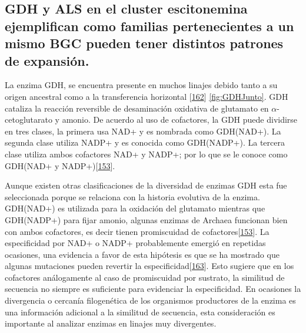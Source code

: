 \documentclass[12pt,twoside]{reedthesis}
\begin{document}
  \subsection{GDH y ALS en el cluster escitonemina ejemplifican como
  familias pertenecientes a un mismo BGC pueden tener distintos patrones
  de
  expansión.}\label{gdh-y-als-en-el-cluster-escitonemina-ejemplifican-como-familias-pertenecientes-a-un-mismo-bgc-pueden-tener-distintos-patrones-de-expansion.}
  
  La enzima GDH, se encuentra presente en muchos linajes debido tanto a su
  origen ancestral como a la transferencia horizontal
  {[}\protect\hyperlink{ref-andersson_evolution_2003}{162}{]}
  \autoref{fig:GDHJunto}. GDH cataliza la reacción reversible de
  desaminación oxidativa de glutamato en \(\alpha\)-cetoglutarato y
  amonio. De acuerdo al uso de cofactores, la GDH puede dividirse en tres
  clases, la primera usa NAD+ y es nombrada como GDH(NAD+). La segunda
  clase utiliza NADP+ y es conocida como GDH(NADP+). La tercera clase
  utiliza ambos cofactores NAD+ y NADP+; por lo que se le conoce como
  GDH(NAD+ y
  NADP+){[}\protect\hyperlink{ref-engel_glutamate_2014}{153}{]}.
  
  Aunque existen otras clasificaciones de la diversidad de enzimas GDH
  esta fue seleccionada porque se relaciona con la historia evolutiva de
  la enzima. GDH(NAD+) es utilizada para la oxidación del glutamato
  mientras que GDH(NADP+) para fijar amonio, algunas enzimas de Archaea
  funcionan bien con ambos cofactores, es decir tienen promiscuidad de
  cofactores{[}\protect\hyperlink{ref-engel_glutamate_2014}{153}{]}. La
  especificidad por NAD+ o NADP+ probablemente emergió en repetidas
  ocasiones, una evidencia a favor de esta hipótesis es que se ha mostrado
  que algunas mutaciones pueden revertir la
  especificidad{[}\protect\hyperlink{ref-lilley_partial_1991}{163}{]}.
  Esto sugiere que en los cofactores análogamente al caso de promiscuidad
  por sustrato, la similitud de secuencia no siempre es suficiente para
  evidenciar la especificidad. En ocasiones la divergencia o cercanía
  filogenética de los organismos productores de la enzima es una
  información adicional a la similitud de secuencia, esta consideración es
  importante al analizar enzimas en linajes muy divergentes.
  
\end{document}
